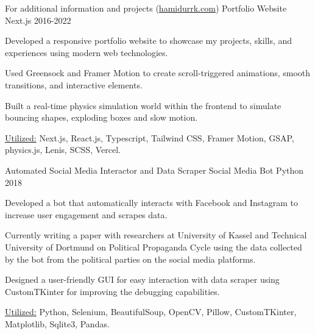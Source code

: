 \begin{cventries}
          \cventryprojects
          {For additional information and projects (\href{https://hamidurrk.com}{hamidurrk.com})} %
          {Portfolio Website} %
          {Next.js} %
          {2016-2022} %
          {
            \begin{cvitems} %
              \item {Developed a responsive portfolio website to showcase my projects, skills, and experiences using modern web technologies.}
              \item {Used Greensock and Framer Motion to create scroll-triggered animations, smooth transitions, and interactive elements.}
              \item {Built a real-time physics simulation world within the frontend to simulate bouncing shapes, exploding boxes and slow motion.}
              \item {\underline{Utilized:} Next.js, React.js, Typescript, Tailwind CSS, Framer Motion, GSAP, physics.js, Lenis, SCSS, Vercel.}
            \end{cvitems}
            }
        
        \cventryprojects
        {Automated Social Media Interactor and Data Scraper} %
        {Social Media Bot} %
        {Python} %
        {2018} %
        {
          \begin{cvitems} %
            \item { Developed a bot that automatically interacts with Facebook and Instagram to increase user engagement and scrapes data.}
            \item { Currently writing a paper with researchers at University of Kassel and Technical University of Dortmund on Political Propaganda Cycle 
            using the data collected by the bot from the political parties on the social media platforms.}
            \item { Designed a user-friendly GUI for easy interaction with data scraper using CustomTKinter for improving the debugging capabilities.}
            \item {\underline{Utilized:} Python, Selenium, BeautifulSoup, OpenCV, Pillow, CustomTKinter, Matplotlib, Sqlite3, Pandas.}
          \end{cvitems}
          }
            

\end{cventries}
